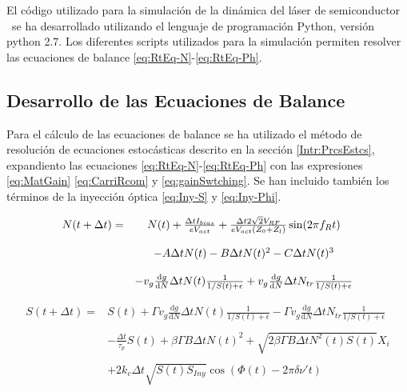 El c\'odigo utilizado para la simulaci\'on de la din\'amica del l\'aser de semiconductor \gs\ se ha desarrollado utilizando el lenguaje de programaci\'on Python, versi\'on python 2.7. Los diferentes scripts utilizados para la simulaci\'on \cite{github} permiten resolver las ecuaciones de balance \ref{eq:RtEq-N}-\ref{eq:RtEq-Ph}.


	\subsection{Desarrollo de las Ecuaciones de Balance}
		\label{Mdl:Code:RtEq}

		Para el c\'alculo de las ecuaciones de balance se ha utilizado el m\'etodo de resoluci\'on de ecuaciones estoc\'asticas descrito en la secci\'on \ref{Intr:PrcsEstcs}, expandiento las ecuaciones \ref{eq:RtEq-N}-\ref{eq:RtEq-Ph} con las expresiones  \ref{eq:MatGain} \ref{eq:CarriRcom} y \ref{eq:gainSwtching}. Se han incluido tambi\'en los t\'erminos de la inyecci\'on \'optica \ref{eq:Iny-S} y \ref{eq:Iny-Phi}.

			\begin{equation}
				\begin{matrix}
					N(t + \Delta t) =  & N(t) + \frac{\Delta t I_{bias} }{e V_{act}} + \frac{\Delta t 2 \sqrt{2} V_{RF}}{eV_{act} (Z_0+Z_l)} \sin(2\pi f_R t) \\ \\
					& - A\Delta t N(t) - B\Delta t N(t)^2 - C\Delta t N(t)^3 \\ \\
					& - v_g \frac{\mathrm{d}g}{\mathrm{d}N} \Delta t N(t) \frac{1}{1/S(t) + \epsilon}  + v_g \frac{\mathrm{d}g}{\mathrm{d}N} \Delta t N_{tr} \frac{1}{1/S(t) + \epsilon}
				\end{matrix}
				\label{eq:Code-N}
			\end{equation}

			\begin{equation}
				\begin{matrix}
					S(t + \Delta t) =  & S(t) + \Gamma v_g \frac{\mathrm{d}g}{\mathrm{d}N} \Delta t N(t) \frac{1}{1/S(t) + \epsilon} - \Gamma v_g \frac{\mathrm{d}g}{\mathrm{d}N} \Delta t N_{tr} \frac{1}{1/S(t) + \epsilon} \\ \\
					& - \frac{\Delta t}{\tau_p}S(t) + \beta\Gamma B\Delta t N(t)^2 + \sqrt{2 \beta \Gamma B \Delta tN^2(t)S(t)} X_i \\ \\
					& + 2k_c\Delta t\sqrt{S(t)S_{Iny}} \cos(\Phi(t) - 2\pi \delta\nu't)
				\end{matrix}
				\label{eq:Code-S}
			\end{equation}

